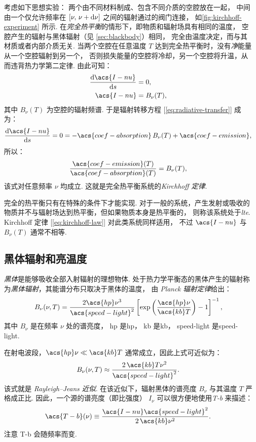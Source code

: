 考虑如下思想实验：
两个由不同材料制成、包含不同介质的空腔放在一起，
中间由一个仅允许频率在 $[\nu, \,\nu+\mathrm{d}\nu]$ 之间的辐射通过的阀门连接，
如\autoref{fig:kirchhoff-experiment} 所示.
在\emph{完全热平衡}的情形下，即物质和辐射场具有相同的温度，
空腔产生的辐射与黑体辐射（见 \autoref{sec:blackbody}）相同，
完全由温度决定，而与其材质或者内部介质无关.
当两个空腔在任意温度 $T$ 达到完全热平衡时，没有\emph{净}能量从一个空腔辐射到另一个，
否则损失能量的空腔将冷却，另一个空腔将升温，从而违背热力学第二定律.
由此可知：
\begin{align}
  \diff{\acs{I-nu}}{s} & = 0 , \\
  \acs{I-nu} & = B_{\nu}(T) ,
\end{align}
其中 $B_{\nu}(T)$ 为空腔的辐射频谱.
于是辐射转移方程 [\autoref{eq:radiative-transfer}] 成为：
\begin{equation}
  \diff{\acs{I-nu}}{s} = 0
    = - \acs{coef-absorption} \,B_{\nu}(T) + \acs{coef-emission} ,
\end{equation}
所以：
\begin{equation}
  \label{eq:kirchhoff-law}
  \frac{\acs{coef-emission}(T)}{\acs{coef-absorption}(T)} = B_{\nu}(T) ,
\end{equation}
该式对任意频率 $\nu$ 均成立.
这就是完全热平衡系统的\emph{Kirchhoff 定律}.

完全的热平衡只有在特殊的条件下才能实现.
对于一般的系统，产生发射或吸收的物质并不与辐射场达到热平衡，但如果物质本身是热平衡的，
则称该系统处于\emph{\acf{lte}}.
Kirchhoff 定律 [\autoref{eq:kirchhoff-law}] 对此类系统同样适用，
不过 $\acs{I-nu}$ 与 $B_{\nu}(T)$ 通常不相等.

\subsection{黑体辐射和亮温度}
\label{sec:blackbody}

\emph{黑体}是能够吸收全部入射辐射的理想物体.
处于热力学平衡态的黑体产生的辐射称为\emph{黑体辐射}，其能谱分布只取决于黑体的温度，
由 \emph{Planck 辐射定律}给出：
\begin{equation}
  \label{eq:planck}
  B_{\nu}(\nu, T) = \frac{2 \acs{hp} \nu^3}{\acs{speed-light}^2}
    \left[ \exp\left( \frac{\acs{hp} \nu}{\acs{kb} T} \right) - 1 \right]^{-1} ,
\end{equation}
其中 $B_{\nu}$ 是在频率 $\nu$ 处的谱亮度，
\acs{hp} 是\acl{hp}，
\acs{kb} 是\acl{kb}，
\acs{speed-light} 是\acl{speed-light}.

在射电波段，$\acs{hp}\nu \ll \acs{kb}T$ 通常成立，因此上式可近似为：
\begin{equation}
  \label{eq:rj-approx}
  B_{\nu}(\nu, T) \approx \frac{2\,\acs{kb}T \nu^2}{\acs{speed-light}^2} .
\end{equation}
该式就是 \emph{Rayleigh--Jeans 近似}.
在该近似下，辐射黑体的谱亮度 $B_{\nu}$ 与其温度 $T$ 严格成正比.
因此，一个源的谱亮度（即比强度） $I_{\nu}$
可以很方便地使用\emph{\acf{T-b}} 来描述：
\begin{equation}
  \label{eq:Tb}
  \acs{T-b}(\nu)
    \equiv \frac{\acs{I-nu} \acs{speed-light}^2}{2 \,\acs{kb} \nu^2} .
\end{equation}
注意 \acs{T-b} 会随频率而变.


